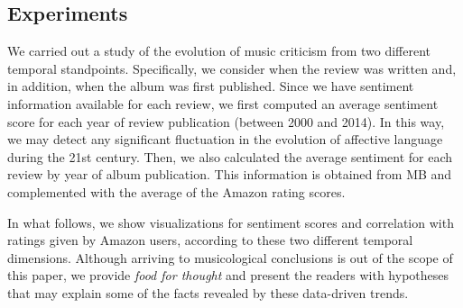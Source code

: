 \subsection{Experiments}

We carried out a study of the evolution of music criticism from two different temporal standpoints. Specifically, we consider when the review was written and, in addition, when the album was first published. Since we have sentiment information available for each review, we first computed an average sentiment score for each year of review publication (between 2000 and 2014). In this way, we may detect any significant fluctuation in the evolution of affective language during the 21st century. Then, we also calculated the average sentiment for each review by year of album publication. This information is obtained from MB and complemented with the average of the Amazon rating scores.

In what follows, we show visualizations for sentiment scores and correlation with ratings given by Amazon users, according to these two different temporal dimensions. Although arriving to musicological conclusions is out of the scope of this paper, we provide \textit{food for thought} and present the readers with hypotheses that may explain some of the facts revealed by these data-driven trends.

